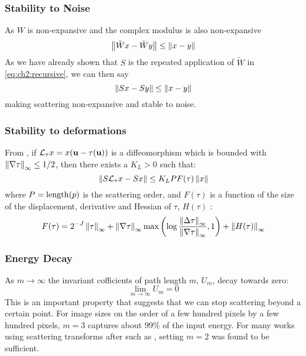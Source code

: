 \subsubsection{Stability to Noise}
As $W$ is non-expansive and the complex modulus is also non-expansive
\begin{equation}
  \left\lVert \tilde{W}x - \tilde{W}y \right\rVert \leq \left\lVert x-y \right\rVert
\end{equation}
As we have already shown that $S$ is the repeated application of $\tilde{W}$ in
\eqref{eq:ch2:recursive}, we can then say
\begin{equation}
  \left\lVert Sx - Sy \right\rVert \leq \left\lVert x-y \right\rVert
\end{equation}
making scattering non-expansive and stable to noise.

\subsubsection{Stability to deformations}
From \cite{mallat_group_2012}, if $\mathcal{L}_\tau x = x(\mathbf{u} -\tau(\mathbf{u}))$ is a
diffeomorphism which is bounded with $\left\lVert \nabla \tau \right\rVert_{\infty} \leq 1/2$,
then there exists a $K_L > 0$ such that:
%
\begin{equation}
  \left\lVert  S \mathcal{L}_{\tau}x  - S x \right\rVert \leq K_L P F(\tau) \left\lVert x \right\rVert
  \label{eq:stability}
\end{equation}
%
where $P = \mathrm{length}(p)$ is the scattering order, and $F(\tau)$ is a function
of the size of the displacement, derivative and Hessian of $\tau$, $H(\tau)$
\cite{mallat_group_2012}: 
\begin{equation}
  F(\tau) = 2^{-J} \left\lVert \tau \right\rVert_{\infty} + \left\lVert \nabla \tau \right\rVert_{\infty} \max\left(\log
  \frac{\left\lVert \Delta \tau \right\rVert_{\infty} }{\left\lVert \nabla \tau \right\rVert_{\infty}}, 1 \right) +
  \left\lVert H(\tau) \right\rVert_{\infty}
\end{equation}

\subsubsection{Energy Decay}
As $m \rightarrow \infty$ the invariant cofficients of path length $m$, $U_m$,
decay towards zero:
\begin{equation}
  \lim_{m \rightarrow \infty} U_m = 0
\end{equation}
This is an important property that suggests that we can stop scattering beyond a
certain point. For image sizes on the order of a few hundred pixels by a few
hundred pixels, $m=3$ captures about $99\%$ of the input energy. For many works
using scattering transforms after \cite{bruna_invariant_2013} such as
\cite{oyallon_deep_2015, oyallon_hybrid_2017, oyallon_scaling_2017}, setting
$m=2$ was found to be sufficient.

